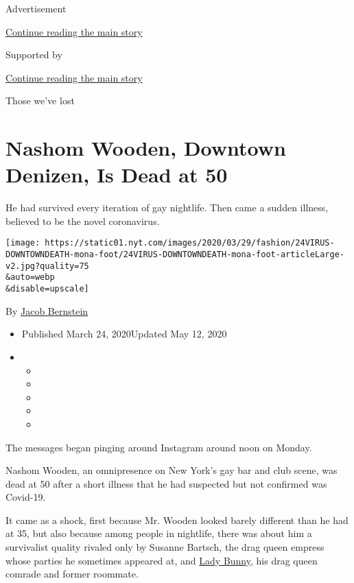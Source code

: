Advertisement

\protect\hyperlink{after-top}{Continue reading the main story}

Supported by

\protect\hyperlink{after-sponsor}{Continue reading the main story}

Those we've lost

\hypertarget{nashom-wooden-downtown-denizen-is-dead-at-50}{%
\section{Nashom Wooden, Downtown Denizen, Is Dead at
50}\label{nashom-wooden-downtown-denizen-is-dead-at-50}}

He had survived every iteration of gay nightlife. Then came a sudden
illness, believed to be the novel coronavirus.

\texttt{[image: https://static01.nyt.com/images/2020/03/29/fashion/24VIRUS-DOWNTOWNDEATH-mona-foot/24VIRUS-DOWNTOWNDEATH-mona-foot-articleLarge-v2.jpg?quality=75\\\&auto=webp\\\&disable=upscale]}

By \href{https://www.nytimes.com/by/jacob-bernstein}{Jacob Bernstein}

\begin{itemize}
\item
  Published March 24, 2020Updated May 12, 2020
\item
  \begin{itemize}
  \item
  \item
  \item
  \item
  \item
  \end{itemize}
\end{itemize}

The messages began pinging around Instagram around noon on Monday.

Nashom Wooden, an omnipresence on New York's gay bar and club scene, was
dead at 50 after a short illness that he had suspected but not confirmed
was Covid-19.

It came as a shock, first because Mr. Wooden looked barely different
than he had at 35, but also because among people in nightlife, there was
about him a survivalist quality rivaled only by Susanne Bartsch, the
drag queen empress whose parties he sometimes appeared at, and
\href{https://www.nytimes.com/2018/09/29/style/lady-bunny-drag-queen.html}{Lady
Bunny}, his drag queen comrade and former roommate.

